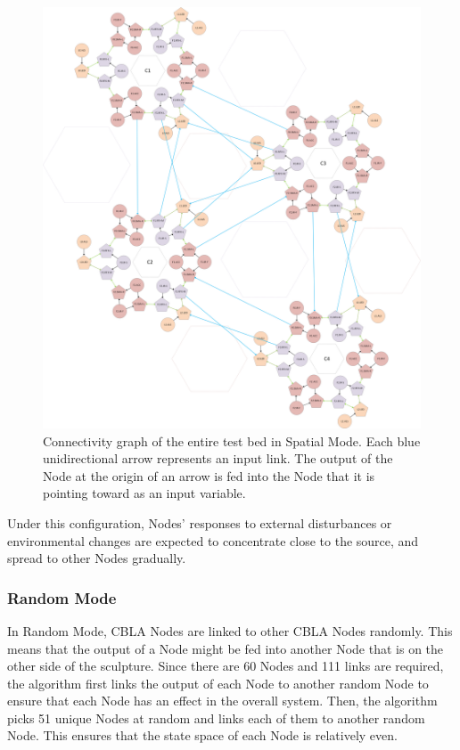 \begin{figure} [!htbp]
	\centering
	\includegraphics[height=0.85 \textheight]{"fig/validations/Spatial Global Mode"}
	\caption[Connectivity graph of the entire test bed in Spatial Mode]{Connectivity graph of the entire test bed in Spatial Mode. Each blue unidirectional arrow represents an input link. The output of the Node at the origin of an arrow is fed into the Node that it is pointing toward as an input variable.}
	\label{fig:Spatial Global Mode}
\end{figure}

Under this configuration, Nodes' responses to external disturbances or environmental changes are expected to concentrate close to the source, and spread to other Nodes gradually. 

\subsubsection{Random Mode}

In Random Mode, CBLA Nodes are linked to other CBLA Nodes randomly. This means that the output of a Node might be fed into another Node that is on the other side of the sculpture. Since there are 60 Nodes and 111 links are required, the algorithm first links the output of each Node to another random Node to ensure that each Node has an effect in the overall system. Then, the algorithm picks 51 unique Nodes at random and links each of them to another random Node. This ensures that the state space of each Node is relatively even. 

